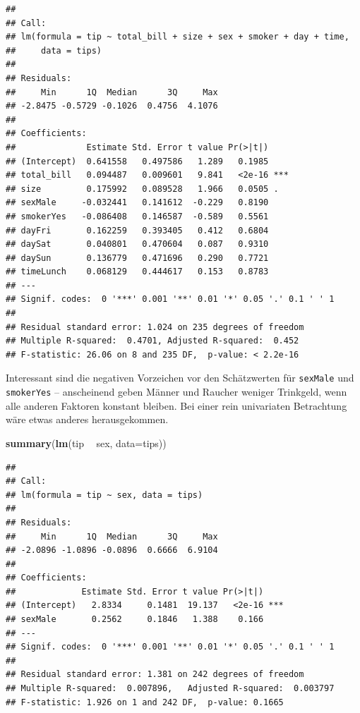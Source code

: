 \documentclass[12pt,ngerman,paper=a4,pagesize,DIV=13]{scrreprt}
\newenvironment{Shaded}{\begin{snugshade}}{\end{snugshade}}
\newcommand{\DataTypeTok}[1]{\textcolor[rgb]{0.13,0.29,0.53}{#1}}
\newcommand{\KeywordTok}[1]{\textcolor[rgb]{0.13,0.29,0.53}{\textbf{#1}}}
\newcommand{\NormalTok}[1]{#1}
\newcommand{\OperatorTok}[1]{\textcolor[rgb]{0.81,0.36,0.00}{\textbf{#1}}}
\newcommand{\StringTok}[1]{\textcolor[rgb]{0.31,0.60,0.02}{#1}}
\begin{document}
\begin{verbatim}
## 
## Call:
## lm(formula = tip ~ total_bill + size + sex + smoker + day + time, 
##     data = tips)
## 
## Residuals:
##     Min      1Q  Median      3Q     Max 
## -2.8475 -0.5729 -0.1026  0.4756  4.1076 
## 
## Coefficients:
##              Estimate Std. Error t value Pr(>|t|)    
## (Intercept)  0.641558   0.497586   1.289   0.1985    
## total_bill   0.094487   0.009601   9.841   <2e-16 ***
## size         0.175992   0.089528   1.966   0.0505 .  
## sexMale     -0.032441   0.141612  -0.229   0.8190    
## smokerYes   -0.086408   0.146587  -0.589   0.5561    
## dayFri       0.162259   0.393405   0.412   0.6804    
## daySat       0.040801   0.470604   0.087   0.9310    
## daySun       0.136779   0.471696   0.290   0.7721    
## timeLunch    0.068129   0.444617   0.153   0.8783    
## ---
## Signif. codes:  0 '***' 0.001 '**' 0.01 '*' 0.05 '.' 0.1 ' ' 1
## 
## Residual standard error: 1.024 on 235 degrees of freedom
## Multiple R-squared:  0.4701, Adjusted R-squared:  0.452 
## F-statistic: 26.06 on 8 and 235 DF,  p-value: < 2.2e-16
\end{verbatim}

Interessant sind die negativen Vorzeichen vor den Schätzwerten für
\texttt{sexMale} und \texttt{smokerYes} -- anscheinend geben Männer und
Raucher weniger Trinkgeld, wenn alle anderen Faktoren konstant bleiben.
Bei einer rein univariaten Betrachtung wäre etwas anderes
herausgekommen.

\begin{Shaded}
\begin{Highlighting}[]
\KeywordTok{summary}\NormalTok{(}\KeywordTok{lm}\NormalTok{(tip }\OperatorTok{~}\StringTok{ }\NormalTok{sex, }\DataTypeTok{data=}\NormalTok{tips))}
\end{Highlighting}
\end{Shaded}

\begin{verbatim}
## 
## Call:
## lm(formula = tip ~ sex, data = tips)
## 
## Residuals:
##     Min      1Q  Median      3Q     Max 
## -2.0896 -1.0896 -0.0896  0.6666  6.9104 
## 
## Coefficients:
##             Estimate Std. Error t value Pr(>|t|)    
## (Intercept)   2.8334     0.1481  19.137   <2e-16 ***
## sexMale       0.2562     0.1846   1.388    0.166    
## ---
## Signif. codes:  0 '***' 0.001 '**' 0.01 '*' 0.05 '.' 0.1 ' ' 1
## 
## Residual standard error: 1.381 on 242 degrees of freedom
## Multiple R-squared:  0.007896,   Adjusted R-squared:  0.003797 
## F-statistic: 1.926 on 1 and 242 DF,  p-value: 0.1665
\end{verbatim}
\end{document}
